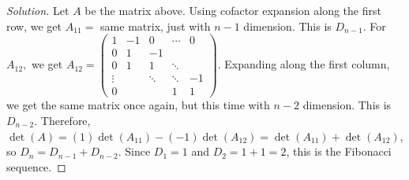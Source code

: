 \documentclass[12pt]{amsart}
\theoremstyle{plain}
\theoremstyle{definition}
\theoremstyle{remark}
\newenvironment{solution}{\begin{proof}[Solution]}{\end{proof}}
\begin{document}
\begin{solution}
  Let $A$ be the matrix above. Using cofactor expansion along the first row, we get $A_{11} =$ same matrix, just with $n-1$ dimension. This is $D_{n-1}$. For $A_{12},$ we get $
A_{12} = \begin{pmatrix}
1 & -1 & 0 & \cdots & 0 \\
0 & 1 & -1 & & \\
0 & 1 & 1 & \ddots & \\
\vdots & & \ddots & \ddots & -1 \\
0 & & & 1 & 1
\end{pmatrix}.
$ Expanding along the first column, we get the same matrix once again, but this time with $n-2$ dimension. This is $D_{n-2}$. Therefore, $\det(A) = (1)\det(A_{11}) - (-1)\det(A_{12}) = \det(A_{11}) + \det(A_{12})$, so $D_n = D_{n-1}+D_{n-2}.$ Since $D_1 = 1$ and $D_2 = 1 + 1 = 2$, this is the Fibonacci sequence.
\end{solution}
\end{document}
